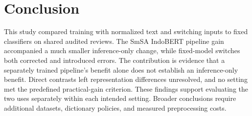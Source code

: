 \par\medskip\noindent
\begin{minipage}{\columnwidth}
\setlength{\parindent}{1em}
\section{Conclusion}
This study compared training with normalized text and switching inputs to fixed classifiers on shared audited reviews. The SmSA IndoBERT pipeline gain accompanied a much smaller inference-only change, while fixed-model switches both corrected and introduced errors. The contribution is evidence that a separately trained pipeline's benefit alone does not establish an inference-only benefit. Direct contrasts left representation differences unresolved, and no setting met the predefined practical-gain criterion. These findings support evaluating the two uses separately within each intended setting. Broader conclusions require additional datasets, dictionary policies, and measured preprocessing costs.
\end{minipage}
